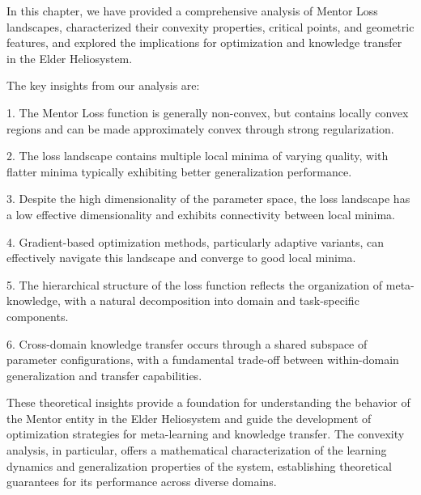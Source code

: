 In this chapter, we have provided a comprehensive analysis of Mentor Loss landscapes, characterized their convexity properties, critical points, and geometric features, and explored the implications for optimization and knowledge transfer in the Elder Heliosystem.

The key insights from our analysis are:

1. The Mentor Loss function is generally non-convex, but contains locally convex regions and can be made approximately convex through strong regularization.

2. The loss landscape contains multiple local minima of varying quality, with flatter minima typically exhibiting better generalization performance.

3. Despite the high dimensionality of the parameter space, the loss landscape has a low effective dimensionality and exhibits connectivity between local minima.

4. Gradient-based optimization methods, particularly adaptive variants, can effectively navigate this landscape and converge to good local minima.

5. The hierarchical structure of the loss function reflects the organization of meta-knowledge, with a natural decomposition into domain and task-specific components.

6. Cross-domain knowledge transfer occurs through a shared subspace of parameter configurations, with a fundamental trade-off between within-domain generalization and transfer capabilities.

These theoretical insights provide a foundation for understanding the behavior of the Mentor entity in the Elder Heliosystem and guide the development of optimization strategies for meta-learning and knowledge transfer. The convexity analysis, in particular, offers a mathematical characterization of the learning dynamics and generalization properties of the system, establishing theoretical guarantees for its performance across diverse domains.